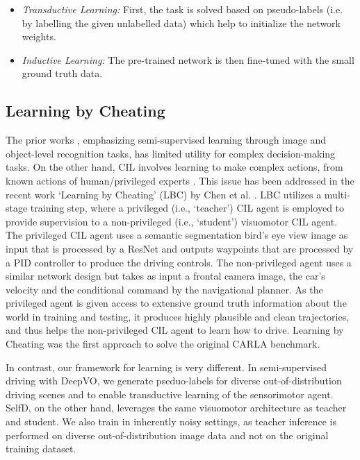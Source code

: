 \documentclass[letterpaper, 12pt]{book}
\theoremstyle{definition}
\theoremstyle{definition}
\theoremstyle{definition}
\theoremstyle{definition}
\theoremstyle{definition}
\begin{document}
\begin{itemize}
\item \emph{Transductive Learning:} First, the task is solved based on pseudo-labels
(i.e. by labelling the given unlabelled data) which help to initialize the
network weights.
\item \emph{Inductive Learning:} The pre-trained network is then fine-tuned with the
small ground truth data.
\end{itemize}

\subsection{Learning by Cheating}
\label{sec:orge061cda}
The prior works \cite{Caine2021,Yang2021, Lee2013,Rizve2021}, emphasizing
semi-supervised learning through image and object-level recognition tasks, has
limited utility for complex decision-making tasks. On the other hand, CIL
involves learning to make complex actions, from known actions of
human/privileged experts \cite{Codevilla2017,Codevilla2019,Prakash2021}. This
issue has been addressed in the recent work `Learning by Cheating' (LBC) by Chen
et al. \cite{Chen2019}. LBC utilizes a multi-stage training step, where a
privileged (i.e., ‘teacher’) CIL agent is employed to provide supervision to a
non-privileged (i.e., ‘student’) visuomotor CIL agent. The privileged CIL agent
uses a semantic segmentation bird’s eye view image as input that is processed by
a ResNet and outputs waypoints that are processed by a PID controller to produce
the driving controls. The non-privileged agent uses a similar network design but
takes as input a frontal camera image, the car’s velocity and the conditional
command by the navigational planner. As the privileged agent is given access to
extensive ground truth information about the world in training and testing, it
produces highly plausible and clean trajectories, and thus helps the
non-privileged CIL agent to learn how to drive. Learning by Cheating was the
first approach to solve the original CARLA benchmark.


In contrast, our framework for learning is very different. In semi-supervised
driving with DeepVO, we generate pseduo-labels for diverse out-of-distribution
driving scenes and to enable transductive learning of the sensorimotor
agent. SelfD, on the other hand, leverages the same visuomotor architecture as
teacher and student. We also train in inherently noisy settings, as teacher
inference is performed on diverse out-of-distribution image data and not on the
original training dataset.
\end{document}
